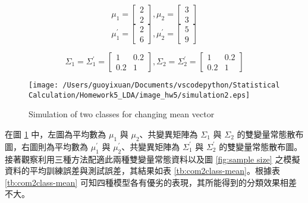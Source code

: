 \begin{itemize}
$$ \mu_1 = \left[
            \begin{array}{clr}
                2  \\
                2 
            \end{array} \right] ,
            \mu_2 = \left[
            \begin{array}{clr}
                3  \\
                3 
            \end{array} \right]$$ 
$$ \mu_1^{'} = \left[
            \begin{array}{clr}
                2  \\
                6 
            \end{array} \right] ,
            \mu_2^{'} = \left[
            \begin{array}{clr}
                5  \\
                9 
            \end{array} \right]  $$ 

$$ \Sigma_1 = \Sigma_1^{'}= \left[
            \begin{array}{clr}
                1 & 0.2  \\
                0.2 & 1
            \end{array} \right] ,
            \Sigma_2 = \Sigma_2^{'} = \left[
            \begin{array}{clr}
                1 & 0.2  \\
                0.2 & 1 
            \end{array} \right]  $$

\begin{figure}[H]
    \centering
        \texttt{[image: /Users/guoyixuan/Documents/vscodepython/Statistical Calculation/Homework5\_LDA/image\_hw5/simulation2.eps]}
    \caption{Simulation of two classes for changing mean vector}
    \label{fig:mean vector}
\end{figure} 

在圖 \ref{fig:mean vector} 中，左圖為平均數為 $\mu_1$ 與 $\mu_2$、共變異矩陣為 $\Sigma_1$ 與 $\Sigma_2$ 的雙變量常態散布圖，右圖則為平均數為 $\mu_1^{'}$ 與 $\mu_2^{'}$、共變異矩陣為 $\Sigma_1^{'}$ 與 $\Sigma_2^{'}$ 的雙變量常態散布圖。接著觀察利用三種方法配適此兩種雙變量常態資料以及圖 \ref{fig:sample size} 之模擬資料的平均訓練誤差與測試誤差，其結果如表 \ref{tb:com2class-mean}。根據表 \ref{tb:com2class-mean} 可知四種模型各有優劣的表現，其所能得到的分類效果相差不大。


\end{itemize}
